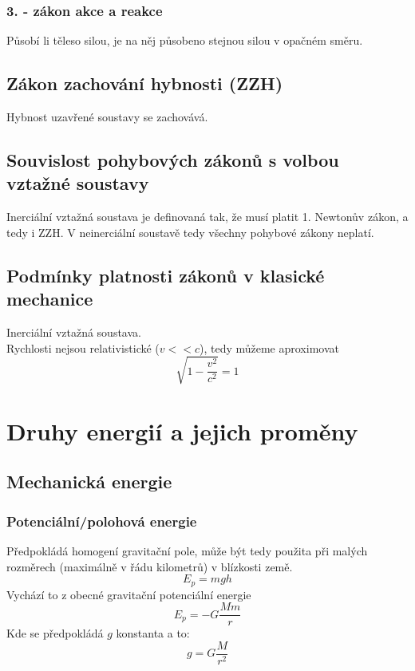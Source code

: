 \documentclass[titlepage]{report}
\begin{document}
\subsection{3. - zákon akce a reakce}
Působí li těleso silou, je na něj působeno stejnou silou v opačném směru.
\section{Zákon zachování hybnosti (ZZH)}
Hybnost uzavřené soustavy se zachovává.
\section{Souvislost pohybových zákonů s volbou vztažné soustavy}
Inerciální vztažná soustava je definovaná tak, že musí platit 1. Newtonův zákon, a tedy i ZZH. V neinerciální soustavě tedy všechny pohybové zákony neplatí.
\section{Podmínky platnosti zákonů v klasické mechanice}
Inerciální vztažná soustava.\\
Rychlosti nejsou relativistické ($v << c$), tedy můžeme aproximovat\\
\begin{equation}
\sqrt{1-\frac{v^2}{c^2}} = 1
\end{equation}
\chapter{Druhy energií a jejich proměny}
\section{Mechanická energie}
\subsection{Potenciální/polohová energie}
Předpokládá homogení gravitační pole, může být tedy použita při malých rozměrech (maximálně v řádu kilometrů) v blízkosti země.\\
\begin{equation}
E_p = mgh
\end{equation}
Vychází to z obecné gravitační potenciální energie
\begin{equation}
E_p = -G\frac{Mm}{r}
\end{equation}
Kde se předpokládá $g$ konstanta a to:
\begin{equation}
g = G\frac{M}{r^2}
\end{equation}
\end{document}
